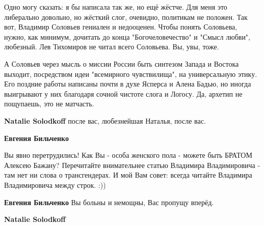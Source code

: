 \begin{itemize}
\begin{itemize}
Одно могу сказать: я бы написала так же, но ещё жёстче. Для меня это либерально
довольно, но жёсткий слог, очевидно, политикам не положен. Так вот, Владимир
Соловьев гениален и недооценен. Чтобы понять Соловьева, нужно, как минимум,
дочитать до конца "Богочеловечество" и "Смысл любви", любезный. Лев Тихомиров
не читал всего Соловьева. Вы, увы, тоже. 

А Соловьев через мысль о миссии России быть синтезом Запада и Востока выходит,
посредством идеи "всемирного чувствилища", на универсальную этику. Его поздние
работы написаны почти в духе Ясперса и Алена Бадью, но иногда выигрывают у них
благодаря сочной чистоте слога и Логосу. Да, архетип не пощупаешь, это не
матчасть.


 
\textbf{Natalie Solodkoff} после вас, любезнейшая Наталья, после вас.

 
\textbf{Евгения Бильченко} 

Вы явно перетрудились! Как Вы - особа женского пола - можете быть БРАТОМ
Алексею Бажану? Перечитайте внимательнее статью Владимира Владимировича - там
нет ни слова о трансгендерах. И мой Вам совет: всегда читайте Владимира
Владимировича между строк. :))


 
\textbf{Евгения Бильченко} Вы больны и немощны, Вас пропущу вперёд.

 
\textbf{Natalie Solodkoff} 


\end{itemize}
\end{itemize}
